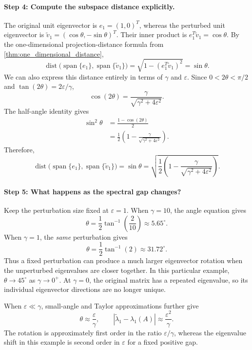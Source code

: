 \documentclass[14pt,letterpaper]{article}
\theoremstyle{plain}
\theoremstyle{definition}
\theoremstyle{remark}
\DeclareMathOperator{\Span}{span}
\DeclareMathOperator{\dist}{dist}
\begin{document}
\paragraph{Step 4: Compute the subspace distance explicitly.}
The original unit eigenvector is $e_1=(1,0)^T$, whereas
the perturbed unit eigenvector is
$\widetilde v_1=(\cos\theta,-\sin\theta)^T$.
Their inner product is $e_1^T\widetilde v_1=\cos\theta$.
By the one-dimensional projection-distance formula from
\cref{thm:one_dimensional_distance},
\[
\boxed{
\dist\bigl(\Span\{e_1\},\Span\{\widetilde v_1\}\bigr)
=\sqrt{1-(e_1^T\widetilde v_1)^2}
=\sin\theta.
}
\]
We can also express this distance entirely in terms of
$\gamma$ and $\varepsilon$. Since
$0<2\theta<\pi/2$ and
$\tan(2\theta)=2\varepsilon/\gamma$,
\[
\cos(2\theta)
=\frac{\gamma}{\sqrt{\gamma^2+4\varepsilon^2}}.
\]
The half-angle identity gives
\[
\begin{aligned}
\sin^2\theta
&=\frac{1-\cos(2\theta)}{2}\\
&=\frac12\left(1-
\frac{\gamma}{\sqrt{\gamma^2+4\varepsilon^2}}\right).
\end{aligned}
\]
Therefore,
\[
\boxed{
\dist\bigl(\Span\{e_1\},\Span\{\widetilde v_1\}\bigr)
=\sin\theta
=\sqrt{\frac12\left(1-
\frac{\gamma}{\sqrt{\gamma^2+4\varepsilon^2}}\right)}.
}
\]

\paragraph{Step 5: What happens as the spectral gap changes?}
Keep the perturbation size fixed at $\varepsilon=1$.
When $\gamma=10$, the angle equation gives
\[
\theta=\frac12\tan^{-1}\left(\frac{2}{10}\right)
\approx5.65^\circ.
\]
When $\gamma=1$, the \emph{same} perturbation gives
\[
\theta=\frac12\tan^{-1}(2)
\approx31.72^\circ.
\]
Thus a fixed perturbation can produce a much larger
eigenvector rotation when the unperturbed eigenvalues
are closer together. In this particular example,
$\theta\to45^\circ$ as $\gamma\to0^+$.
At $\gamma=0$, the original matrix has a repeated eigenvalue,
so its individual eigenvector directions are no longer unique.

When $\varepsilon\ll\gamma$, small-angle and Taylor
approximations further give
\[
\boxed{
\theta\approx\frac{\varepsilon}{\gamma},
\qquad
|\widetilde\lambda_1-\lambda_1(A)|
\approx\frac{\varepsilon^2}{\gamma}.
}
\]
The rotation is approximately first order in the
ratio $\varepsilon/\gamma$, whereas the eigenvalue
shift in this example is second order in $\varepsilon$
for a fixed positive gap.
\end{document}
